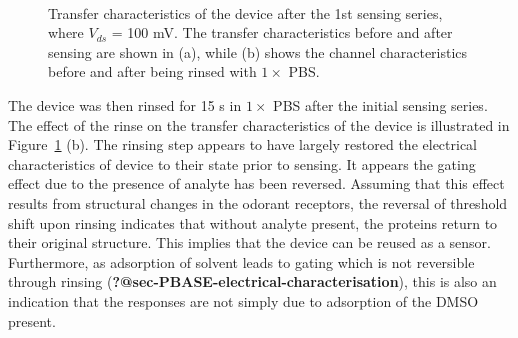\documentclass[
  a4paper,
]{scrbook}
\begin{document}
\begin{figure}
\begin{minipage}[t]{0.46\linewidth}
{{}

}

\end{minipage}%
%
\begin{minipage}[t]{0.01\linewidth}

{\centering 

~

}

\end{minipage}%

\caption{\label{fig-OR10a-TX-1}Transfer characteristics of the device
after the 1st sensing series, where \(V_{ds}\) = 100 mV. The transfer
characteristics before and after sensing are shown in (a), while (b)
shows the channel characteristics before and after being rinsed with
\(1 \times\) PBS.}

\end{figure}

The device was then rinsed for 15 s in \(1 \times\) PBS after the
initial sensing series. The effect of the rinse on the transfer
characteristics of the device is illustrated in
Figure~\ref{fig-OR10a-TX-1} (b). The rinsing step appears to have
largely restored the electrical characteristics of device to their state
prior to sensing. It appears the gating effect due to the presence of
analyte has been reversed. Assuming that this effect results from
structural changes in the odorant receptors, the reversal of threshold
shift upon rinsing indicates that without analyte present, the proteins
return to their original structure. This implies that the device can be
reused as a sensor. Furthermore, as adsorption of solvent leads to
gating which is not reversible through rinsing
(\textbf{?@sec-PBASE-electrical-characterisation}), this is also an
indication that the responses are not simply due to adsorption of the
DMSO present.
\end{document}
